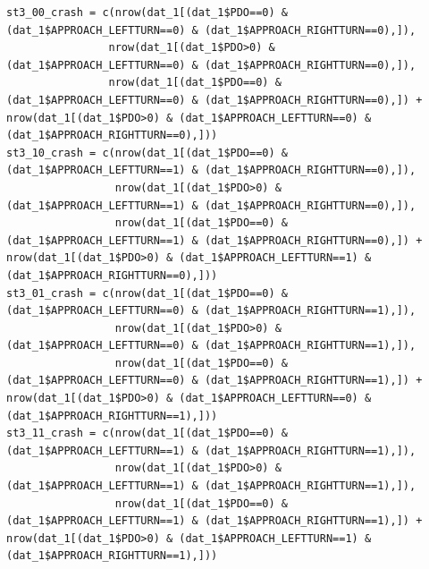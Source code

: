 \documentclass[11pt]{scrartcl} %
\begin{document}
\begin{lstlisting}
st3_00_crash = c(nrow(dat_1[(dat_1$PDO==0) & (dat_1$APPROACH_LEFTTURN==0) & (dat_1$APPROACH_RIGHTTURN==0),]),
                nrow(dat_1[(dat_1$PDO>0) & (dat_1$APPROACH_LEFTTURN==0) & (dat_1$APPROACH_RIGHTTURN==0),]),
                nrow(dat_1[(dat_1$PDO==0) & (dat_1$APPROACH_LEFTTURN==0) & (dat_1$APPROACH_RIGHTTURN==0),]) + nrow(dat_1[(dat_1$PDO>0) & (dat_1$APPROACH_LEFTTURN==0) & (dat_1$APPROACH_RIGHTTURN==0),]))
st3_10_crash = c(nrow(dat_1[(dat_1$PDO==0) & (dat_1$APPROACH_LEFTTURN==1) & (dat_1$APPROACH_RIGHTTURN==0),]),
                 nrow(dat_1[(dat_1$PDO>0) & (dat_1$APPROACH_LEFTTURN==1) & (dat_1$APPROACH_RIGHTTURN==0),]),
                 nrow(dat_1[(dat_1$PDO==0) & (dat_1$APPROACH_LEFTTURN==1) & (dat_1$APPROACH_RIGHTTURN==0),]) + nrow(dat_1[(dat_1$PDO>0) & (dat_1$APPROACH_LEFTTURN==1) & (dat_1$APPROACH_RIGHTTURN==0),]))
st3_01_crash = c(nrow(dat_1[(dat_1$PDO==0) & (dat_1$APPROACH_LEFTTURN==0) & (dat_1$APPROACH_RIGHTTURN==1),]),
                 nrow(dat_1[(dat_1$PDO>0) & (dat_1$APPROACH_LEFTTURN==0) & (dat_1$APPROACH_RIGHTTURN==1),]),
                 nrow(dat_1[(dat_1$PDO==0) & (dat_1$APPROACH_LEFTTURN==0) & (dat_1$APPROACH_RIGHTTURN==1),]) + nrow(dat_1[(dat_1$PDO>0) & (dat_1$APPROACH_LEFTTURN==0) & (dat_1$APPROACH_RIGHTTURN==1),]))
st3_11_crash = c(nrow(dat_1[(dat_1$PDO==0) & (dat_1$APPROACH_LEFTTURN==1) & (dat_1$APPROACH_RIGHTTURN==1),]),
                 nrow(dat_1[(dat_1$PDO>0) & (dat_1$APPROACH_LEFTTURN==1) & (dat_1$APPROACH_RIGHTTURN==1),]),
                 nrow(dat_1[(dat_1$PDO==0) & (dat_1$APPROACH_LEFTTURN==1) & (dat_1$APPROACH_RIGHTTURN==1),]) + nrow(dat_1[(dat_1$PDO>0) & (dat_1$APPROACH_LEFTTURN==1) & (dat_1$APPROACH_RIGHTTURN==1),]))


\end{lstlisting}
\end{document}
